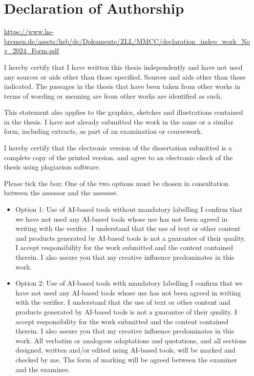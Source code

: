 \documentclass[
  11pt,
  a4paper,
  twoside]{scrbook}
\begin{document}

\chapter*{Declaration of Authorship}\label{declaration-of-authorship}


\url{https://www.hs-bremen.de/assets/hsb/de/Dokumente/ZLL/MMCC/declaration_indep_work_Nov_2024_Form.pdf}

I hereby certify that I have written this thesis independently and have
not used any sources or aids other than those specified. Sources and
aids other than those indicated. The passages in the thesis that have
been taken from other works in terms of wording or meaning are from
other works are identified as such.

This statement also applies to the graphics, sketches and illustrations
contained in the thesis. I have not already submitted the work in the
same or a similar form, including extracts, as part of an examination or
coursework.

I hereby certify that the electronic version of the dissertation
submitted is a complete copy of the printed version. and agree to an
electronic check of the thesis using plagiarism software.

Please tick the box: One of the two options must be chosen in
consultation between the assessor and the assessee.

\begin{itemize}
\item[$\square$]
  Option 1: Use of AI-based tools without mandatory labelling I confirm
  that we have not used any AI-based tools whose use has not been agreed
  in writing with the verifier. I understand that the use of text or
  other content and products generated by AI-based tools is not a
  guarantee of their quality. I accept responsibility for the work
  submitted and the content contained therein. I also assure you that my
  creative influence predominates in this work.
\item[$\square$]
  Option 2: Use of AI-based tools with mandatory labelling I confirm
  that we have not used any AI-based tools whose use has not been agreed
  in writing with the verifier. I understand that the use of text or
  other content and products generated by AI-based tools is not a
  guarantee of their quality. I accept responsibility for the work
  submitted and the content contained therein. I also assure you that my
  creative influence predominates in this work. All verbatim or
  analogous adaptations and quotations, and all sections designed,
  written and/or edited using AI-based tools, will be marked and checked
  by me. The form of marking will be agreed between the examiner and the
  examinee.
\end{itemize}
\end{document}
